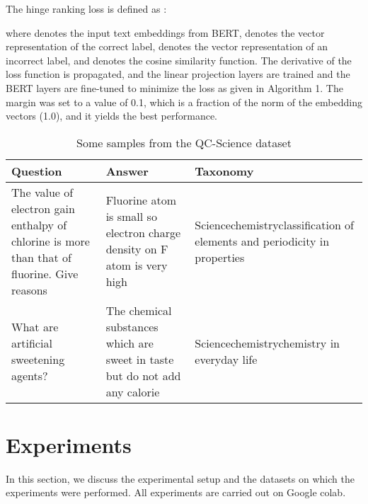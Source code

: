 \documentclass[runningheads, envcountsame, a4paper]{llncs}
\begin{document}
The hinge ranking loss is defined as :
 
 where  denotes the input text embeddings from BERT,
 denotes the vector representation of the correct label,  denotes the vector representation of an incorrect label, and  denotes the cosine similarity function. The derivative of the loss function is propagated, and the linear projection layers are trained and the BERT layers are fine-tuned to minimize the loss as given in Algorithm 1. The margin was set to a value of 0.1, which is a fraction of the norm of the embedding vectors (1.0), and it yields the best performance.
   \begin{table}
  \small
 \centering
\caption{Some samples from the QC-Science dataset}\label{tab1}
\begin{tabular}{|p{3.2cm}|p{4cm}|p{4.8cm}|}
\hline
Question &  Answer & Taxonomy\\
\hline
The value of electron gain enthalpy of chlorine is more than that of fluorine.  Give reasons &  Fluorine atom is small  so electron charge density on F atom is very high & Sciencechemistryclassification of elements and periodicity in properties\\ \hline
What are artificial sweetening agents? & The chemical substances which are sweet in taste but do not add any calorie & Sciencechemistrychemistry in everyday life\\
\hline
\end{tabular}
\end{table}


 \section{Experiments}
 In this section, we discuss the experimental setup and the datasets on which the experiments were performed. All experiments are carried out on Google colab.
\end{document}
